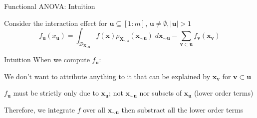 \documentclass[english,aspectratio=169]{beamer}
\let\tempone\itemize
\let\temptwo\enditemize
\renewenvironment{itemize}{\tempone\addtolength{\itemsep}{0.35\baselineskip}}{\temptwo}
\renewcommand{\emph}[1]{\textcolor[HTML]{006d2c}{\fontseries{sb}\selectfont #1}}
\begin{document}
\begin{frame}[fragile]{Functional ANOVA: Intuition}
\small

Consider the \emph{interaction effect} for $\bm{u} \subseteq [1:m]$, $\bm{u} \neq \emptyset, \lvert \bm{u} \rvert > 1$
\begin{equation*}
  f_{\bm{u}} (x_{\bm{u}}) = \int_{\mathcal{D}_{\bm{X}_{\sim \bm{u}}}} f (\bm{x}) \rho_{\bm{X}_{\sim \bm{u}}} (\bm{x}_{\sim \bm{u}}) \; d\bm{x}_{\sim \bm{u}} - \sum_{\bm{v} \subset \bm{u}} f_{\bm{v}} (\bm{x}_{\bm{v}})
\end{equation*}

\begin{block}{Intuition}
  When we compute $f_{\bm{u}}$:
  \vspace{0.5em}
  \begin{itemize}
    \item We don't want to attribute anything to it that can be explained by $\bm{x}_{\bm{v}}$ for $\bm{v} \subset \bm{u}$
    \item $f_{\bm{u}}$ must be strictly only due to $\bm{x}_{\bm{u}}$;
          \emph{not} $\bm{x}_{\sim \bm{u}}$ \emph{nor} subsets of $\bm{x}_{\bm{u}}$ (lower order terms)
    \item Therefore, we integrate $f$ over all $\bm{x}_{\sim \bm{u}}$ then substract all the lower order terms
  \end{itemize}
\end{block}

\end{frame}
\end{document}
